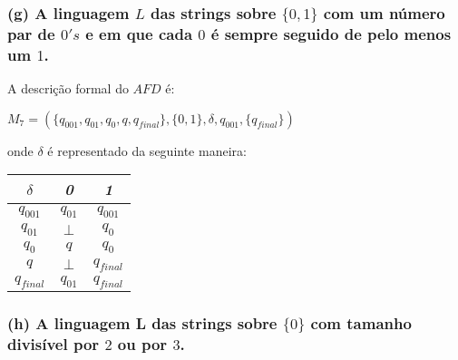 \documentclass{article}
\begin{document}
\subsubsection*{(g) A linguagem $L$ das strings sobre $\{0, 1\}$ com um número par de $0's$ e em que cada $0$ é sempre seguido de pelo menos um $1$.}

\begin{center}
\end{center}

A descrição formal do $AFD$ é:
\begin{center}
  $M_7 = (\{q_{001},q_{01},q_{0},q,q_{final}\}, \{0,1\},\delta,q_{001}, \{q_{final}\})$
\end{center}
onde $\delta$ é representado da seguinte maneira:

\begin{table}[htbp]
  \centering
  \begin{tabular}{c|cc}
    \textit{$\delta$}  & \textit{0}        & \textit{1}         \\ \hline
    \textit{$q_{001}$} & \textit{$q_{01}$} & \textit{$q_{001}$} \\
    \textit{$q_{01}$}  & \textit{$\perp$}  & \textit{$q_{0}$}   \\
    \textit{$q_{0}$}   & \textit{$q$}      & \textit{$q_{0}$}   \\
    $q$                & $\perp$           & $q_{final}$        \\
    $q_{final}$        & $q_{01}$          & $q_{final}$
  \end{tabular}
\end{table}
\subsubsection*{(h) A linguagem L das strings sobre $\{0\}$ com tamanho divisível por $2$ ou por $3$.}
\end{document}
